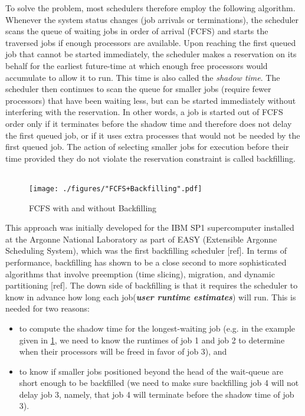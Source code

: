 To solve the problem, most schedulers therefore employ the following algorithm. Whenever the system status changes (job arrivals or terminations), the scheduler scans the queue of waiting jobs in order of arrival (FCFS) and starts the traversed jobs if enough processors are available. Upon reaching the first queued job that cannot be started immediately, the scheduler makes a reservation on its behalf for the earliest future-time at which enough free processors would accumulate to allow it to run. This time is also called the \textit{shadow time}. The scheduler then continues to scan the queue for smaller jobs (require fewer processors) that have been waiting less, but can be started immediately without interfering with the reservation. In other words, a job is started out of FCFS order only if it terminates before the shadow time and therefore does not delay the first queued job, or if it uses extra processes that would not be needed by the first queued job. The action of selecting smaller jobs for execution before their time provided they do not violate the reservation constraint is called backfilling.\\ \\
\begin{figure}[!htbp]
\centering
\texttt{[image: ./figures/"FCFS+Backfilling".pdf]}
\caption{FCFS with and without Backfilling}
\label{fig:2}
\end{figure}
This approach was initially developed for the IBM SP1 supercomputer installed at the Argonne National Laboratory as part of EASY (Extensible Argonne Scheduling System), which was the first backfilling scheduler [ref]. In terms of performance, backfilling has shown to be a close second to more sophisticated algorithms that involve preemption (time slicing), migration, and dynamic partitioning [ref]. The down side of backfilling is that it requires the scheduler to know in advance how long each job(\textbf{\textit{user runtime estimates}}) will run. This is needed for two reasons:
\begin{itemize}
\item to compute the shadow time for the longest-waiting job (e.g. in the example given in \ref{fig:2}, we need to know the runtimes of job 1 and job 2 to determine when their processors will be freed in favor of job 3), and
\item to know if smaller jobs positioned beyond the head of the wait-queue are short enough to be backfilled (we need to make sure backfilling job 4 will not delay job 3, namely, that job 4 will terminate before the shadow time of job 3).
\end{itemize}
